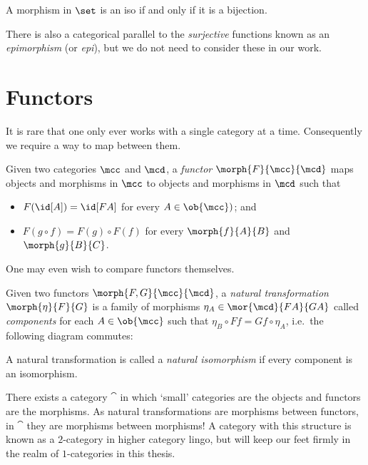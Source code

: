 \begin{example}
    A morphism in \(\set\) is an iso if and only if it is a bijection.
\end{example}

\begin{remark}
    There is also a categorical parallel to the \emph{surjective} functions
    known as an \emph{epimorphism} (or \emph{epi}), but we do not need to
    consider these in our work.
\end{remark}

\section{Functors}

It is rare that one only ever works with a single category at a time.
Consequently we require a way to map between them.

\begin{definition}[Functor]
    Given two categories \(\mcc\) and \(\mcd\), a \emph{functor} \(
        \morph{F}{\mcc}{\mcd}
    \) maps objects and morphisms in \(\mcc\) to objects and morphisms in
    \(\mcd\) such that
    \begin{itemize}
        \item \(F(\id[A]) = \id[FA]\) for every \(A \in \ob{\mcc})\); and
        \item \(F(g \circ f) = F(g) \circ F(f)\) for every \(\morph{f}{A}{B}\)
        and \(\morph{g}{B}{C}\).
    \end{itemize}
\end{definition}

One may even wish to compare functors themselves.

\begin{definition}
    Given two functors \(\morph{F, G}{\mcc}{\mcd}\), a
    \emph{natural transformation} \(\morph{\eta}{F}{G}\) is a family of
    morphisms \(
        \eta_A \in \mor{\mcd}{FA}{GA}
    \) called \emph{components} for each \(A \in \ob{\mcc}\) such that \(
        \eta_B \circ Ff = Gf \circ \eta_A
    \), i.e.\ the following diagram commutes:
    \begin{center}
        
    \end{center}
    A natural transformation is called a \emph{natural isomorphism} if
    every component is an isomorphism.
\end{definition}

\begin{remark}
    There exists a category \(\cat\) in which `small' categories are the objects
    and functors are the morphisms.
    As natural transformations are morphisms between functors, in \(\cat\) they
    are morphisms between morphisms!
    A category with this structure is known as a \(2\)-category in higher
    category lingo, but will keep our feet firmly in the realm of
    \(1\)-categories in this thesis.
\end{remark}

